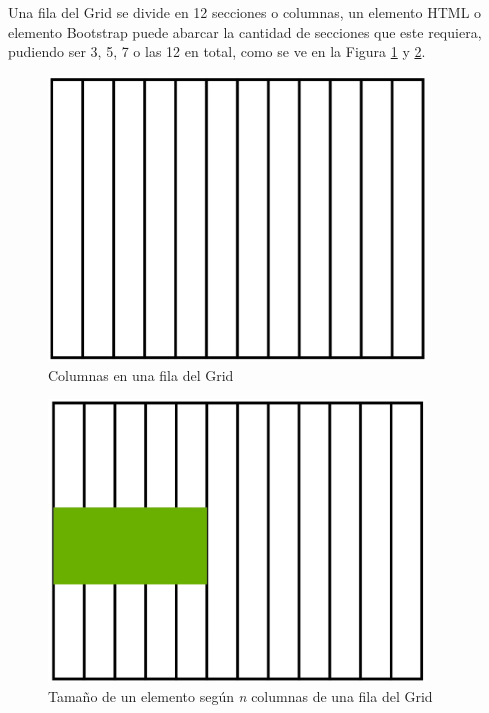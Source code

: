 Una fila del Grid se divide en 12 secciones o columnas, un elemento HTML o elemento Bootstrap puede abarcar la cantidad de secciones que este requiera, pudiendo ser 3, 5, 7 o las 12 en total, como se ve en la Figura \ref{fig:2} y \ref{fig:3}.
\begin{figure}[H]
    \centering
    \caption{Columnas en una fila del Grid}
    \label{fig:2}
    \includegraphics[width=10cm]{ss/grid-columnas.png}
\end{figure}
\begin{figure}[H]
    \centering
    \caption{Tamaño de un elemento según \textit{n} columnas de una fila del Grid}
    \label{fig:3}
    \includegraphics[width=10cm]{ss/grid-columnas-selected.png}
\end{figure}


